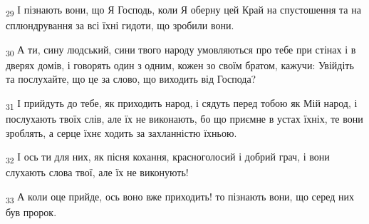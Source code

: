 \begin{tcolorbox}
\textsubscript{29} І пізнають вони, що Я Господь, коли Я оберну цей Край на спустошення та на сплюндрування за всі їхні гидоти, що зробили вони.
\end{tcolorbox}
\begin{tcolorbox}
\textsubscript{30} А ти, сину людський, сини твого народу умовляються про тебе при стінах і в дверях домів, і говорять один з одним, кожен зо своїм братом, кажучи: Увійдіть та послухайте, що це за слово, що виходить від Господа?
\end{tcolorbox}
\begin{tcolorbox}
\textsubscript{31} І прийдуть до тебе, як приходить народ, і сядуть перед тобою як Мій народ, і послухають твоїх слів, але їх не виконають, бо що приємне в устах їхніх, те вони зроблять, а серце їхнє ходить за захланністю їхньою.
\end{tcolorbox}
\begin{tcolorbox}
\textsubscript{32} І ось ти для них, як пісня кохання, красноголосий і добрий грач, і вони слухають слова твої, але їх не виконують!
\end{tcolorbox}
\begin{tcolorbox}
\textsubscript{33} А коли оце прийде, ось воно вже приходить! то пізнають вони, що серед них був пророк.
\end{tcolorbox}
